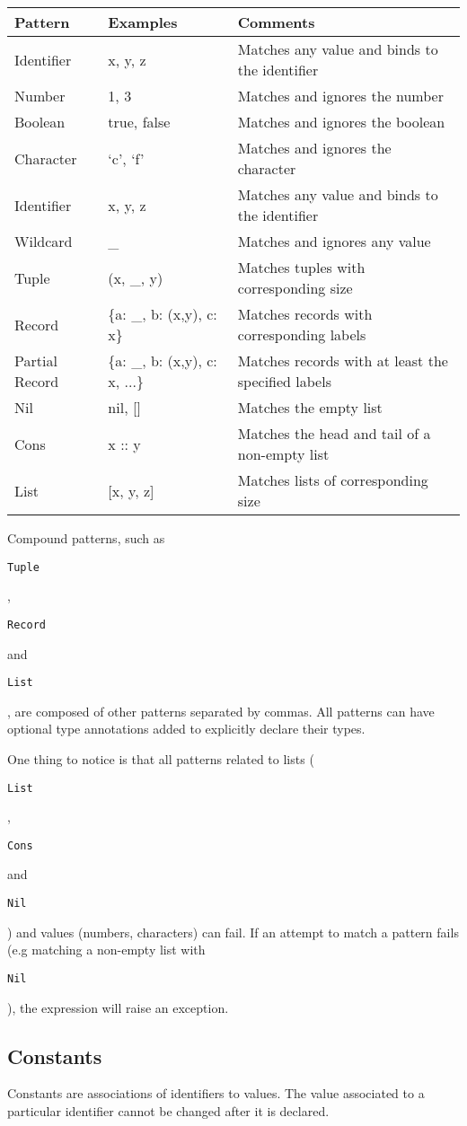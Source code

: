 \documentclass{article}
\def\code#1{\begin{footnotesize}\texttt{#1}\end{footnotesize}}
\begin{document}
\begin{tabular}{|l|l|l|}
  \hline
  \textbf{Pattern} & \textbf{Examples} & \textbf{Comments}\\
  \hline
  Identifier & x, y, z & Matches any value and binds to the identifier\\
  \hline
  Number & 1, 3 & Matches and ignores the number\\
  \hline
  Boolean & true, false & Matches and ignores the boolean\\
  \hline
  Character & `c', `f' & Matches and ignores the character\\
  \hline
  Identifier & x, y, z & Matches any value and binds to the identifier\\
  \hline
  Wildcard & _ & Matches and ignores any value\\
  \hline
  Tuple & (x, _, y) & Matches tuples with corresponding size\\
  \hline
  Record & \{a: _, b: (x,y), c: x\} & Matches records with corresponding labels\\
  \hline
  Partial Record & \{a: _, b: (x,y), c: x, ...\} & Matches records with at least the specified labels\\
  \hline
  Nil & nil, [] & Matches the empty list\\
  \hline
  Cons & x :: y & Matches the head and tail of a non-empty list\\
  \hline
  List & [x, y, z] & Matches lists of corresponding size\\
  \hline
\end{tabular}

\medskip

Compound patterns, such as \code{Tuple}, \code{Record} and \code{List}, are composed of other patterns separated by commas.
All patterns can have optional type annotations added to explicitly declare their types.

\smallskip

One thing to notice is that all patterns related to lists (\code{List}, \code{Cons} and \code{Nil}) and values (numbers, characters) can fail.
If an attempt to match a pattern fails (e.g matching a non-empty list with \code{Nil}), the expression will raise an exception.

\subsection{Constants}

Constants are associations of identifiers to values.
The value associated to a particular identifier cannot be changed after it is declared.
\end{document}
